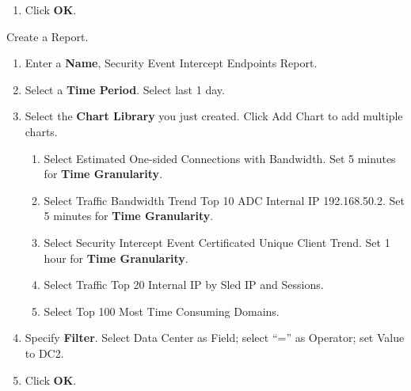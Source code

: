 \begin{description}
\begin{enumerate}
\begin{enumerate}
            \item 	Click \textbf{OK}.
        \end{enumerate}
    \end{enumerate}
    \item[STEP 3.]	Create a Report.  
    \begin{enumerate}
        \item 	Enter a \textbf{Name}, Security Event Intercept Endpoints Report.
        \item 	Select a \textbf{Time Period}. Select last 1 day.
        \item 	Select the \textbf{Chart Library} you just created. Click Add Chart to add multiple charts.
        \begin{enumerate}
            \item 	Select Estimated One-sided Connections with Bandwidth. Set 5 minutes for \textbf{Time Granularity}.
            \item 	Select Traffic Bandwidth Trend Top 10 ADC Internal IP 192.168.50.2. Set 5 minutes for \textbf{Time Granularity}.
            \item 	Select Security Intercept Event Certificated Unique Client Trend. Set 1 hour for \textbf{Time Granularity}.
            \item 	Select Traffic Top 20 Internal IP by Sled IP and Sessions.
            \item 	Select Top 100 Most Time Consuming Domains.
        \end{enumerate}    
        \item 	Specify \textbf{Filter}. Select Data Center as Field; select “=” as Operator; set Value to DC2. 
        \item 	Click \textbf{OK}.
    \end{enumerate}
\end{description}